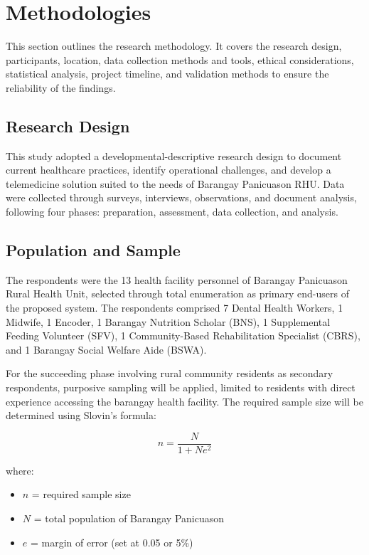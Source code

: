 \documentclass{research}
\begin{document}
\section{Methodologies}

This section outlines the research methodology. It covers the research design, participants,
location, data collection methods and tools, ethical considerations, statistical analysis, project
timeline, and validation methods to ensure the reliability of the findings.

\subsection*{Research Design}

This study adopted a developmental-descriptive research design to document current healthcare
practices, identify operational challenges, and develop a telemedicine solution suited to the
needs of Barangay Panicuason RHU. Data were collected through surveys, interviews, observations,
and document analysis, following four phases: preparation, assessment, data collection, and
analysis.

\subsection*{Population and Sample}

The respondents were the 13 health facility personnel of Barangay Panicuason Rural Health Unit,
selected through total enumeration as primary end-users of the proposed system. The respondents
comprised 7 Dental Health Workers, 1 Midwife, 1 Encoder, 1 Barangay Nutrition Scholar (BNS), 1
Supplemental Feeding Volunteer (SFV), 1 Community-Based Rehabilitation Specialist (CBRS), and 1
Barangay Social Welfare Aide (BSWA).

For the succeeding phase involving rural community residents as secondary respondents, purposive
sampling will be applied, limited to residents with direct experience accessing the barangay
health facility. The required sample size will be determined using Slovin's formula:

\begin{equation}
  n = \frac{N}{1 + Ne^{2}}
  \label{eq:slovin}
\end{equation}

\noindent where:
\begin{itemize}[leftmargin=1in, label={}]
  \item $n$ = required sample size
  \item $N$ = total population of Barangay Panicuason
  \item $e$ = margin of error (set at 0.05 or 5\%)
\end{itemize}
\end{document}
